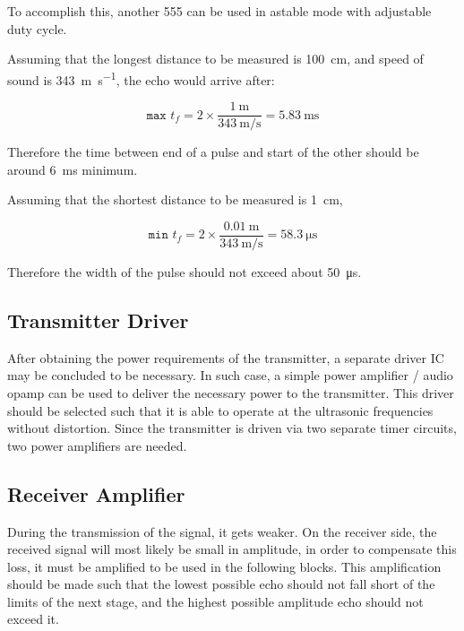 \documentclass[12pt, a4paper]{article}
\begin{document}
	\bigskip
	To accomplish this, another 555 can be used in astable mode with adjustable duty cycle.
	
	\bigskip
	 Assuming that the longest distance to be measured is \SI{100}{\centi\metre}, and speed of sound is \SI{343}{\metre\per\second}, the echo would arrive after:

    \begin{equation}
        \texttt{max }t_f = 2 \times \frac{\SI{1}{\metre}}{\SI{343}{\metre\per\second}} = \SI{5.83}{\milli\second}
    \end{equation}

    \noindent Therefore the time between end of a pulse and start of the other should be around \SI{6}{\milli\second} minimum. 

    \noindent Assuming that the shortest distance to be measured is \SI{1}{\centi\metre}, 

    \begin{equation}
        \texttt{min }t_f = 2 \times \frac{\SI{0.01}{\metre}}{\SI{343}{\metre\per\second}} = \SI{58.3}{\micro\second}
    \end{equation}

    \noindent Therefore the width of the pulse should not exceed about \SI{50}{\micro\second}.


	\subsection{Transmitter Driver}
	After obtaining the power requirements of the transmitter, a separate driver IC may be concluded to be necessary. In such case, a simple power amplifier / audio opamp can be used to deliver the necessary power to the transmitter. This driver should be selected such that it is able to operate at the ultrasonic frequencies without distortion. Since the transmitter is driven via two separate timer circuits, two power amplifiers are needed. 
	
	\subsection{Receiver Amplifier}
	During the transmission of the signal, it gets weaker.  On the receiver side, the received signal will most likely be small in amplitude, in order to compensate this loss, it must be amplified to be used in the following blocks. This amplification should be made such that the lowest possible echo should not fall short of the limits of the next stage, and the highest possible amplitude echo should not exceed it.
\end{document}
